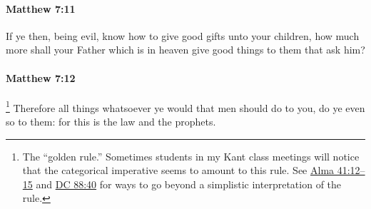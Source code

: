 		\paragraph{Matthew 7:11} %
			\label{MATTHEW-7-11}

			If ye then, being evil, know how to give good gifts unto your children, how much more shall your Father which is in heaven give good things to them that ask him?

			\begin{framed}
			\scriptsize
				\begin{compactdesc}
					\item[SBLG]  \hyperref[PONEROS]{} 
				\end{compactdesc}
			\end{framed}

		\paragraph{Matthew 7:12} %
			\label{MATTHEW-7-12}

				\footnote{%
					The ``golden rule.'' Sometimes students in my Kant class meetings will notice that the categorical imperative seems to amount to this rule. See \hyperref[ALMA-41-12]{Alma 41:12--15} and \hyperref[DC88-40]{DC 88:40} for ways to go beyond a simplistic interpretation of the rule.
					}%
			Therefore all things whatsoever ye would that men should do to you, do ye even so to them: for this is the law and the prophets.

